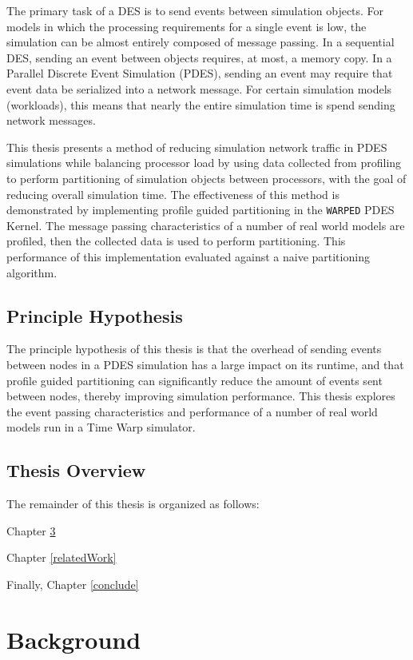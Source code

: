 \documentclass[11pt]{book}
\begin{document}
The primary task of a DES is to send events between simulation objects. For models in which the processing requirements for a single event is low, the simulation can be almost entirely composed of message passing. In a sequential DES, sending an event between objects requires, at most, a memory copy. In a Parallel Discrete Event Simulation (PDES), sending an event may require that event data be serialized into a network message. For certain simulation models (workloads), this means that nearly the entire simulation time is spend sending network messages. 

This thesis presents a method of reducing simulation network traffic in PDES simulations while balancing processor load by using data collected from profiling to perform partitioning of simulation objects between processors, with the goal of reducing overall simulation time. The effectiveness of this method is demonstrated by implementing profile guided partitioning in the \texttt{WARPED} PDES Kernel. The message passing characteristics of a number of real world models are profiled, then the collected data is used to perform partitioning. This performance of this implementation evaluated against a naive partitioning algorithm.

\section{Principle Hypothesis}

The principle hypothesis of this thesis is that the overhead of sending events between nodes in a PDES simulation has a large impact on its runtime, and that profile guided partitioning can significantly reduce the amount of events sent between nodes, thereby improving simulation performance. This thesis explores the event passing characteristics and performance of a number of real world models run in a Time Warp simulator.

\section{Thesis Overview}

The remainder of this thesis is organized as follows:
 
Chapter \ref{background}

Chapter \ref{relatedWork}


Finally, Chapter \ref{conclude}


\chapter{Background}\label{background}
\end{document}
